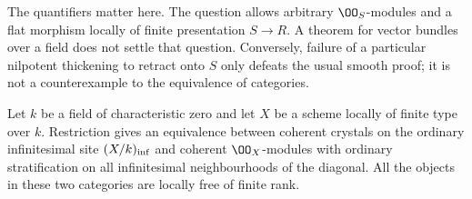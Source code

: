 The quantifiers matter here.  The question allows arbitrary $\OO_S$-modules and a flat morphism locally of finite presentation $S\to R$.  A theorem for vector bundles over a field does not settle that question.  Conversely, failure of a particular nilpotent thickening to retract onto $S$ only defeats the usual smooth proof; it is not a counterexample to the equivalence of categories.

\begin{proposition}\label{prop:DE-E2-coherent}
Let $k$ be a field of characteristic zero and let $X$ be a scheme locally of finite type over $k$.  Restriction gives an equivalence between coherent crystals on the ordinary infinitesimal site $(X/k)_{\rm inf}$ and coherent $\OO_X$-modules with ordinary stratification on all infinitesimal neighbourhoods of the diagonal.  All the objects in these two categories are locally free of finite rank.
\end{proposition}
